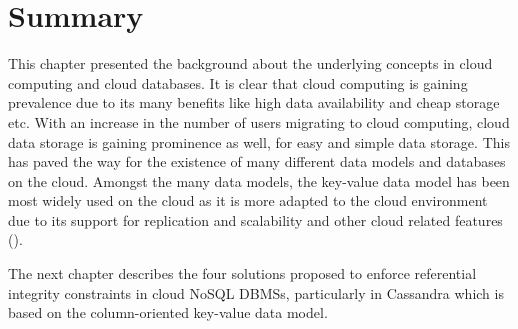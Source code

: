 













\section{Summary}



This chapter presented the background about the underlying concepts in cloud
computing and cloud databases.  It is clear that cloud computing is gaining
prevalence due to its many benefits like high data availability and cheap
storage etc.  With an increase in the number of users
migrating to cloud computing,   cloud data storage is gaining prominence as well,  
for easy and simple data storage.  This has paved the way for the existence
of many different data models and databases on the cloud.  Amongst the many data
models,   the key-value data model has been  most widely used  on the cloud
as it is more adapted to the cloud environment due to its support for
replication and scalability and other cloud related features (). 



The next chapter describes the four solutions proposed to enforce referential
integrity constraints in cloud \ac{NoSQL} \acp{DBMS},   particularly in
Cassandra which is based on the column-oriented key-value data model. 





